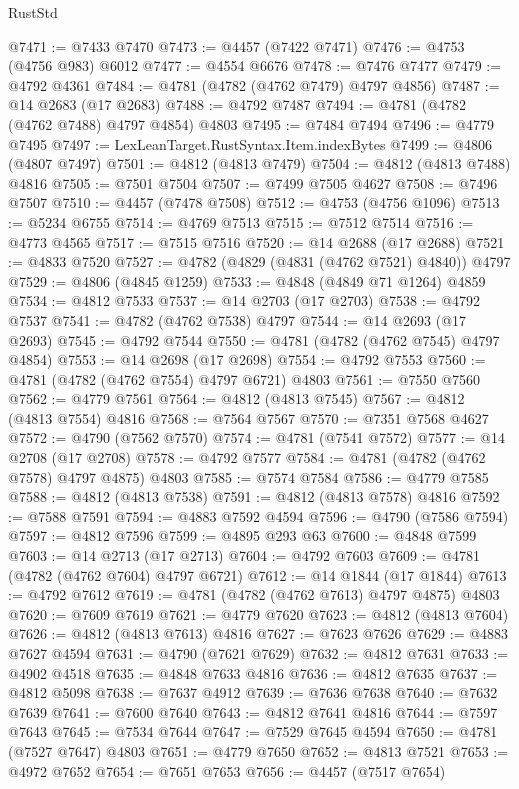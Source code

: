\begin{lexlean}{RustStd}
\begin{coremodule}
@7471 := @7433 @7470
@7473 := @4457 (@7422 @7471)
@7476 := @4753 (@4756 @983) @6012
@7477 := @4554 @6676
@7478 := @7476 @7477
@7479 := @4792 @4361
@7484 := @4781 (@4782 (@4762 @7479) @4797 @4856)
@7487 := @14 @2683 (@17 @2683)
@7488 := @4792 @7487
@7494 := @4781 (@4782 (@4762 @7488) @4797 @4854) @4803
@7495 := @7484 @7494
@7496 := @4779 @7495
@7497 := LexLeanTarget.RustSyntax.Item.indexBytes
@7499 := @4806 (@4807 @7497)
@7501 := @4812 (@4813 @7479)
@7504 := @4812 (@4813 @7488) @4816
@7505 := @7501 @7504
@7507 := @7499 @7505 @4627
@7508 := @7496 @7507
@7510 := @4457 (@7478 @7508)
@7512 := @4753 (@4756 @1096)
@7513 := @5234 @6755
@7514 := @4769 @7513
@7515 := @7512 @7514
@7516 := @4773 @4565
@7517 := @7515 @7516
@7520 := @14 @2688 (@17 @2688)
@7521 := @4833 @7520
@7527 := @4782 (@4829 (@4831 (@4762 @7521) @4840)) @4797
@7529 := @4806 (@4845 @1259)
@7533 := @4848 (@4849 @71 @1264) @4859
@7534 := @4812 @7533
@7537 := @14 @2703 (@17 @2703)
@7538 := @4792 @7537
@7541 := @4782 (@4762 @7538) @4797
@7544 := @14 @2693 (@17 @2693)
@7545 := @4792 @7544
@7550 := @4781 (@4782 (@4762 @7545) @4797 @4854)
@7553 := @14 @2698 (@17 @2698)
@7554 := @4792 @7553
@7560 := @4781 (@4782 (@4762 @7554) @4797 @6721) @4803
@7561 := @7550 @7560
@7562 := @4779 @7561
@7564 := @4812 (@4813 @7545)
@7567 := @4812 (@4813 @7554) @4816
@7568 := @7564 @7567
@7570 := @7351 @7568 @4627
@7572 := @4790 (@7562 @7570)
@7574 := @4781 (@7541 @7572)
@7577 := @14 @2708 (@17 @2708)
@7578 := @4792 @7577
@7584 := @4781 (@4782 (@4762 @7578) @4797 @4875) @4803
@7585 := @7574 @7584
@7586 := @4779 @7585
@7588 := @4812 (@4813 @7538)
@7591 := @4812 (@4813 @7578) @4816
@7592 := @7588 @7591
@7594 := @4883 @7592 @4594
@7596 := @4790 (@7586 @7594)
@7597 := @4812 @7596
@7599 := @4895 @293 @63
@7600 := @4848 @7599
@7603 := @14 @2713 (@17 @2713)
@7604 := @4792 @7603
@7609 := @4781 (@4782 (@4762 @7604) @4797 @6721)
@7612 := @14 @1844 (@17 @1844)
@7613 := @4792 @7612
@7619 := @4781 (@4782 (@4762 @7613) @4797 @4875) @4803
@7620 := @7609 @7619
@7621 := @4779 @7620
@7623 := @4812 (@4813 @7604)
@7626 := @4812 (@4813 @7613) @4816
@7627 := @7623 @7626
@7629 := @4883 @7627 @4594
@7631 := @4790 (@7621 @7629)
@7632 := @4812 @7631
@7633 := @4902 @4518
@7635 := @4848 @7633 @4816
@7636 := @4812 @7635
@7637 := @4812 @5098
@7638 := @7637 @4912
@7639 := @7636 @7638
@7640 := @7632 @7639
@7641 := @7600 @7640
@7643 := @4812 @7641 @4816
@7644 := @7597 @7643
@7645 := @7534 @7644
@7647 := @7529 @7645 @4594
@7650 := @4781 (@7527 @7647) @4803
@7651 := @4779 @7650
@7652 := @4813 @7521
@7653 := @4972 @7652
@7654 := @7651 @7653
@7656 := @4457 (@7517 @7654)

\end{coremodule}
\end{lexlean}
